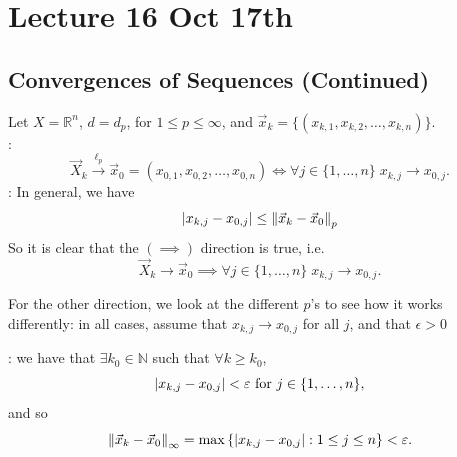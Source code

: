 \documentclass[notoc,notitlepage]{tufte-book}
\newcommand{\norm}[1]{\left\| #1 \right\|}
\begin{document}


\chapter{Lecture 16 Oct 17th}%
\label{chp:lecture_16_oct_17th}

\section{Convergences of Sequences (Continued)}%
\label{sec:convergences_of_sequences_continued}

\begin{eg}
  Let $X = \mathbb{R}^n$, $d = d_p$, for $1 \leq p \leq \infty$, and $\vec{x}_k = \{ ( x_{k, 1}, x_{k, 2}, \ldots, x_{k, n} ) \}$.\\
  \noindent{}:
  \begin{equation*}
    \vec{X}_k \overset{\ell_p}{\to} \vec{x}_0 = (x_{0, 1}, x_{0, 2}, \ldots, x_{0, n}) \iff \forall j \in \{ 1, \ldots, n \} \; x_{k, j} \to x_{0, j}.
  \end{equation*}
  : In general, we have
  \begin{equation*}
    \abs{x_{k, j} - x_{0, j}} \leq \norm{\vec{x}_k - \vec{x}_0}_p
  \end{equation*}
  So it is clear that the $(\implies)$ direction is true, i.e.
  \begin{equation*}
    \vec{X}_k \to \vec{x}_0 \implies \forall j \in \{ 1, \ldots, n \} \; x_{k, j} \to x_{0, j}.
  \end{equation*}

  For the other direction, we look at the different $p$'s to see how it works differently: in all cases, assume that $x_{k, j} \to x_{0, j}$ for all $j$, and that $\epsilon > 0$

  \noindent{} : we have that $\exists k_0 \in \mathbb{N}$ such that $\forall k \geq k_0$,
  \begin{equation*}
    \left|x_{k, j} - x_{0, j}\right| < \varepsilon \text{ for } j \in \{ 1, \ldots, n \},
  \end{equation*}
  and so
  \begin{equation*}
    \norm{\vec{x}_k - \vec{x}_0}_\infty = \max \left\{ \abs{ x_{k, j} - x_{0, j} } : 1 \leq j \leq n \right\} < \epsilon.
  \end{equation*}


\end{eg}
\end{document}
